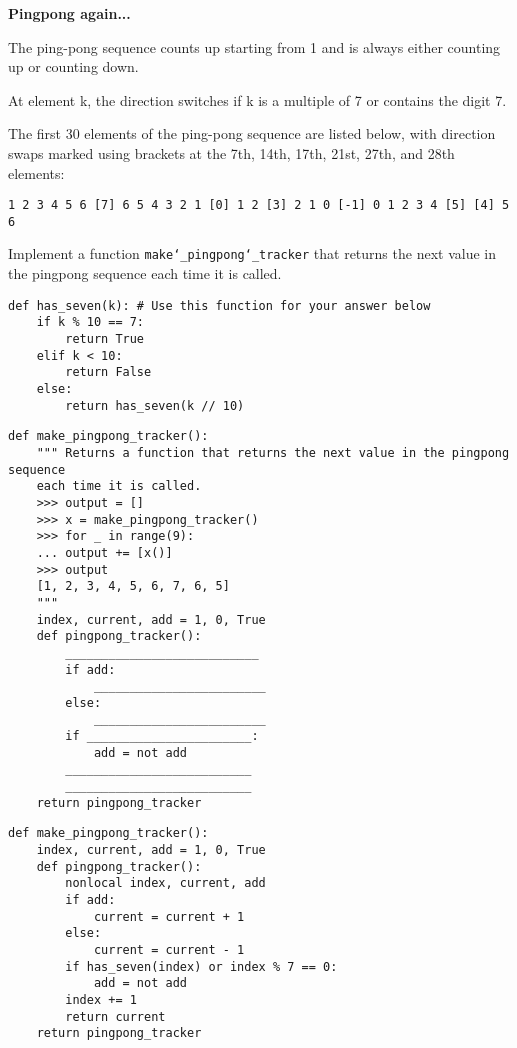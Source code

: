 \question \textbf{Pingpong again...}\\
\begin{nonsol}
The ping-pong sequence counts up starting from 1 and is always either counting
up or counting down.

At element k, the direction switches if k is a multiple of 7 or contains the
digit 7.

The first 30 elements of the ping-pong sequence are listed below, with direction
swaps marked using brackets at the 7th, 14th, 17th, 21st, 27th, and 28th
elements:
\begin{lstlisting}
1 2 3 4 5 6 [7] 6 5 4 3 2 1 [0] 1 2 [3] 2 1 0 [-1] 0 1 2 3 4 [5] [4] 5 6
\end{lstlisting}
\end{nonsol}
Implement a function \texttt{make\char`_pingpong\char`_tracker} that returns the
next value in the pingpong sequence each time it is called.

\begin{lstlisting}
def has_seven(k): # Use this function for your answer below
    if k % 10 == 7:
        return True
    elif k < 10:
        return False
    else:
        return has_seven(k // 10)
\end{lstlisting}

\begin{nonsol}
\begin{lstlisting}
def make_pingpong_tracker():
    """ Returns a function that returns the next value in the pingpong sequence
    each time it is called.
    >>> output = []
    >>> x = make_pingpong_tracker()
    >>> for _ in range(9):
    ... output += [x()]
    >>> output
    [1, 2, 3, 4, 5, 6, 7, 6, 5]
    """
    index, current, add = 1, 0, True
    def pingpong_tracker():
        ___________________________
        if add:
            ________________________
        else:
            ________________________
        if _______________________:
            add = not add
        __________________________
        __________________________
    return pingpong_tracker

\end{lstlisting}
\end{nonsol}

\begin{solution}
\begin{lstlisting}
def make_pingpong_tracker():
    index, current, add = 1, 0, True
    def pingpong_tracker():
        nonlocal index, current, add
        if add:
            current = current + 1
        else:
            current = current - 1
        if has_seven(index) or index % 7 == 0:
            add = not add
        index += 1
        return current
    return pingpong_tracker
\end{lstlisting}
\end{solution}
